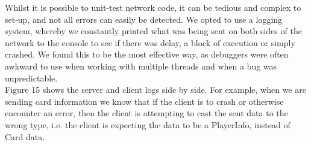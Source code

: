 \documentclass[11pt]{article}
\begin{document}
Whilst it is possible to unit-test network code, it can be tedious and complex to set-up, and not all errors can easily be detected. We opted to use a logging system, whereby we constantly printed what was being sent on both sides of the network to the console to see if there was delay, a block of execution or simply crashed. We found this to be the most effective way, as debuggers were often awkward to use when working with multiple threads and when a bug was unpredictable.\\

Figure 15 shows the server and client logs side by side. For example, when we are sending card information we know that if the client is to crash or otherwise encounter an error, then the client is attempting to cast the sent data to the wrong type, i.e. the client is expecting the data to be a PlayerInfo, instead of Card data.
\end{document}
